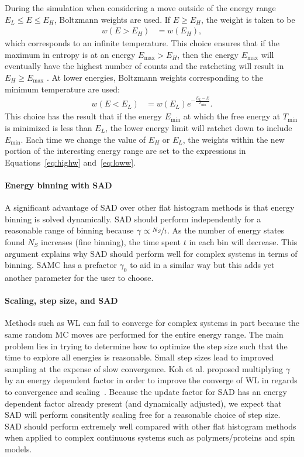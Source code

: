 \documentclass[letterpaper,twocolumn,amsmath,amssymb,pre,aps,10pt]{revtex4-1}
\begin{document}
During the simulation when considering a move outside of the energy
range $E_L \le E \le E_H$, Boltzmann weights are used.  If $E\ge E_H$,
the weight is taken to be
\begin{align}\label{eq:highw}
  w(E>E_H) &= w(E_H),
\end{align}
which corresponds to an infinite temperature.
This choice ensures that
if the maximum in entropy is at an energy $E_{\max}>E_H$, then the energy
$E_{\max}$
will eventually have the highest number of counts and the ratcheting will
result in $E_H\ge E_{\max}$ .
At lower energies, Boltzmann weights corresponding to the minimum temperature
are used:
\begin{align}\label{eq:loww}
  w(E<E_L) &= w(E_L)e^{-\frac{E_L-E}{T_{\min}}}.
\end{align}
This choice has the result that if the energy $E_{\min}$ at which the free
energy at $T_{\min}$ is minimized is less than $E_L$, the lower energy
limit will ratchet down to include $E_{\min}$.
Each time we change the value of $E_H$ or $E_L$, the weights within the
new portion of the interesting energy range are set to the expressions
in Equations~\ref{eq:highw} and~\ref{eq:loww}.

\paragraph{Energy binning with SAD}

A significant advantage of SAD over other flat histogram methods is
that energy binning is solved dynamically. SAD should perform
independently for a reasonable range of binning because $\gamma \propto
\nicefrac{N_S}{t}$.  As the number of energy states found $N_S$
increases (fine binning), the time spent $t$ in each bin will decrease.
This argument explains why SAD should perform well for complex systems
in terms of binning. SAMC has a prefactor $\gamma_0$ to aid in a
similar way but this adds yet another parameter for the user to choose.

\paragraph{Scaling, step size, and SAD}
Methods such as WL can fail to converge for complex systems in part
because the same random MC moves are performed for the entire energy
range.  The main problem lies in trying to determine how to optimize
the step size such that the time to explore all energies is reasonable.
Small step sizes lead to improved sampling at the expense of slow
convergence. Koh et al. proposed multiplying $\gamma$ by an energy
dependent factor in order to improve the converge of WL in regards to
convergence and scaling~\cite{koh2013dynamically}.  Because the update
factor for SAD has an energy dependent factor already present (and
dynamically adjusted), we expect that SAD will perform consitently
scaling free for a reasonable choice of step size.  SAD should perform
extremely well compared with other flat histogram methods when applied
to complex continuous systems such as polymers/proteins and spin models.
\end{document}
